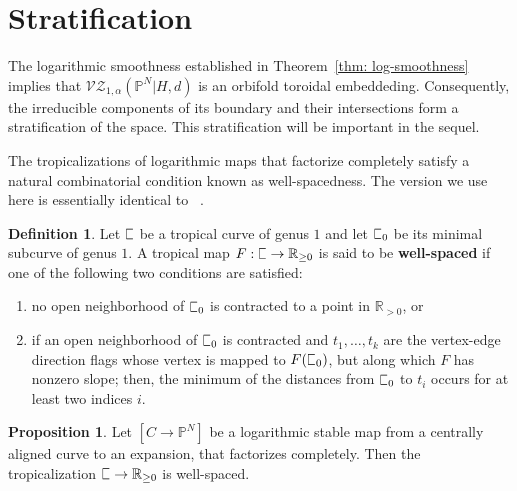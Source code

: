 \documentclass[11pt]{amsart}
\newcommand{\plC}{\scalebox{0.8}[1.3]{$\sqsubset$}}
\renewcommand{\to}{\rightarrow}
\theoremstyle{definition}
\newtheorem{prop}[thm]{Proposition}
\theoremstyle{definition}
\newtheorem{definition}[thm]{Definition}
\begin{document}
\section{Stratification}

\noindent The logarithmic smoothness established in Theorem~\ref{thm: log-smoothness} implies that $\mathcal{VZ}_{1,\alpha}(\mathbb P^N|H,d)$ is an orbifold toroidal embeddeding. Consequently, the irreducible components of its boundary and their intersections form a stratification of the space. This stratification will be important in the sequel. 

The tropicalizations of logarithmic maps that factorize completely satisfy a natural combinatorial condition known as well-spacedness. The version we use here is essentially identical to~
\cite{RSPW2}. 

\begin{definition}
Let $\plC$ be a tropical curve of genus $1$ and let $\plC_0$ be its minimal subcurve of genus $1$. A tropical map $F: \plC\to \mathbb R_{\geq 0}$ is said to be \textbf{well-spaced} if one of the following two conditions are satisfied:
\begin{enumerate}
    \item no open neighborhood of $\plC_0$ is contracted to a point in $\mathbb R_{>0}$, or
    \item if an open neighborhood of $\plC_0$ is contracted and $t_1,\ldots,t_k$ are the vertex-edge direction flags whose vertex is mapped to $F(\plC_0)$, but along which $F$ has nonzero slope; then, the minimum of the distances from $\plC_0$ to $t_i$ occurs for at least two indices $i$.
\end{enumerate}
\end{definition}

\begin{prop}\label{prop: well-spaced}
Let $[C\to \mathbb P^N]$ be a logarithmic stable map from a centrally aligned curve to an expansion, that factorizes completely. Then the tropicalization $\plC\to \mathbb R_{\geq 0}$ is well-spaced.
\end{prop}
\end{document}
